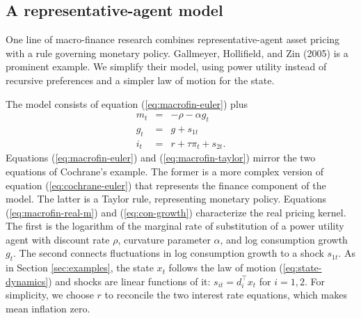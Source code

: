 \documentclass[12pt]{article}
\begin{document}
{\subsection{A representative-agent model}
\label{sec:rep-agent}

One line of macro-finance research combines representative-agent
asset pricing with a rule governing monetary policy.
Gallmeyer, Hollifield, and Zin (2005) is a prominent example.
We simplify their model,
using power utility instead of recursive preferences and
a simpler law of motion for the state.

The model consists of equation (\ref{eq:macrofin-euler}) plus
\begin{eqnarray}
    m_t &=& - \rho - \alpha g_t \label{eq:macrofin-real-m} \\
    g_t &=& g + s_{1t}   \label{eq:con-growth} \\
    i_t &=& r + \tau \pi_t + s_{2t} .
        \label{eq:macrofin-taylor}
\end{eqnarray}
Equations (\ref{eq:macrofin-euler}) and (\ref{eq:macrofin-taylor}) mirror
the two equations of Cochrane's example.
The former is
a more complex version of equation (\ref{eq:cochrane-euler})
that represents the finance component of the model.
The latter is a Taylor rule, representing monetary policy.
Equations (\ref{eq:macrofin-real-m}) and (\ref{eq:con-growth}) characterize the real pricing kernel.
The first is the logarithm of the marginal rate of substitution
of a power utility agent with discount rate $\rho$,
curvature parameter $\alpha$,
and log consumption growth $g_t$.
The second connects fluctuations in log consumption growth to a shock $s_{1t}$.
As in Section \ref{sec:examples}, the state $x_t$ follows the law of motion (\ref{eq:state-dynamics})
and shocks are linear functions of it: $s_{it} = d_i^\top x_t $ for $i=1,2$.
For simplicity, we choose $r$ to reconcile the two interest rate equations,
which makes mean inflation zero.

}
\end{document}
